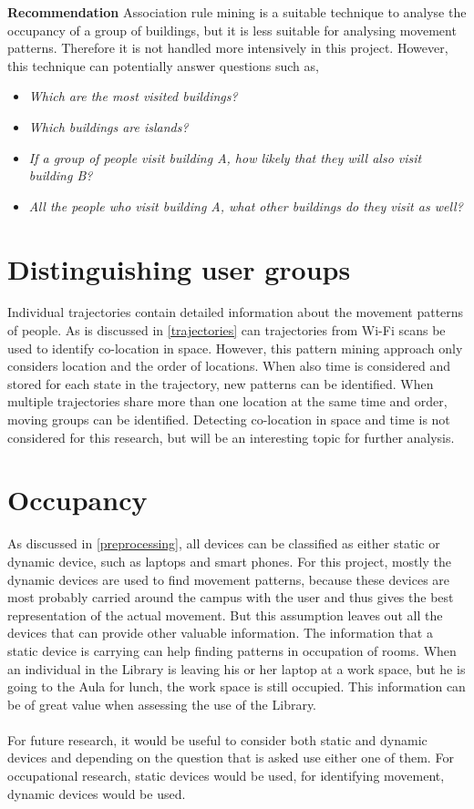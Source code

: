 \textbf{Recommendation}
Association rule mining is a suitable technique to analyse the occupancy of a group of buildings, but it is less suitable for analysing movement patterns.
Therefore it is not handled more intensively in this project. However, this technique can potentially answer questions such as,\\
\begin{itemize}
\item \textit{Which are the most visited buildings?}
\item \textit{Which buildings are islands?}
\item \textit{If a group of people visit building A, how likely that they will also visit building B?}
\item \textit{All the people who visit building A, what other buildings do they visit as well?}
\end{itemize}

\section{Distinguishing user groups}
Individual trajectories contain detailed information about the movement patterns of people. As is discussed in \autoref{trajectories} can trajectories from Wi-Fi scans be used to identify co-location in space. However, this pattern mining approach only considers location and the order of locations. When also time is considered and stored for each state in the trajectory, new patterns can be identified. When multiple trajectories share more than one location at the same time and order, moving groups can be identified. Detecting co-location in space and time is not considered for this research, but will be an interesting topic for further analysis.

\section{Occupancy}
As discussed in \autoref{preprocessing}, all devices can be classified as either static or dynamic device, such as laptops and smart phones. For this project, mostly the dynamic devices are used to find movement patterns, because these devices are most probably carried around the campus with the user and thus gives the best representation of the actual movement. But this assumption leaves out all the devices that can provide other valuable information. The information that a static device is carrying can help finding patterns in occupation of rooms. When an individual in the Library is leaving his or her laptop at a work space, but he is going to the Aula for lunch, the work space is still occupied. This information can be of great value when assessing the use of the Library. \\\\
For future research, it would be useful to consider both static and dynamic devices and depending on the question that is asked use either one of them. For occupational research, static devices would be used, for identifying movement, dynamic devices would be used.

